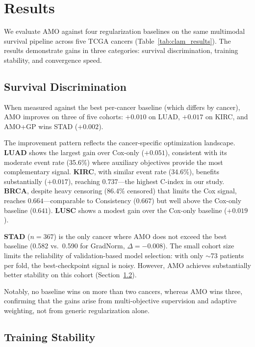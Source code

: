 \documentclass[10pt,twocolumn,letterpaper]{article}
\begin{document}
\section{Results}
\label{sec:clam_results}

We evaluate AMO against four regularization baselines on the same
multimodal survival pipeline across five TCGA cancers
(Table~\ref{tab:clam_results}). The results demonstrate gains
in three categories: survival discrimination, training stability,
and convergence speed.

\subsection{Survival Discrimination}

When measured against the best
per-cancer baseline (which differs by cancer), AMO improves on
three of five cohorts: $+0.010$ on
LUAD, $+0.017$ on KIRC, and AMO+GP wins STAD ($+0.002$).

The improvement pattern reflects the cancer-specific optimization
landscape. \textbf{LUAD} shows the largest gain over Cox-only ($+0.051$),
consistent with its moderate event rate (35.6\%) where auxiliary
objectives provide the most complementary signal.
\textbf{KIRC}, with similar event rate (34.6\%), benefits
substantially ($+0.017$), reaching 0.737---the highest C-index
in our study.
\textbf{BRCA}, despite heavy censoring (86.4\% censored) that
limits the Cox signal, reaches $0.664$---comparable to Consistency
($0.667$) but well above the Cox-only baseline ($0.641$).
\textbf{LUSC} shows a modest gain over the Cox-only baseline
($+0.019$).

\textbf{STAD} ($n\!=\!367$) is the only cancer where AMO does not
exceed the best baseline (0.582 vs.\ 0.590 for GradNorm,
$\Delta = -0.008$). The small cohort size limits the reliability
of validation-based model selection: with only $\sim$73 patients
per fold, the best-checkpoint signal is noisy. However, AMO
achieves substantially better stability on this cohort
(Section~\ref{sec:stability}).

Notably, no baseline wins on more than two cancers, whereas AMO
wins three, confirming that the gains arise from multi-objective
supervision and adaptive weighting, not from generic regularization
alone.

\subsection{Training Stability}
\label{sec:stability}
\end{document}
